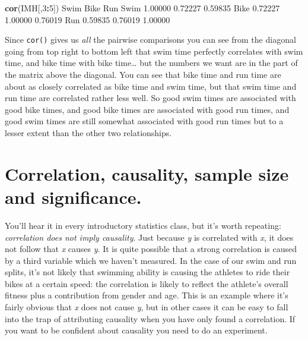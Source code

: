 \documentclass[
]{book}
\newenvironment{Shaded}{\begin{snugshade}}{\end{snugshade}}
\newcommand{\DecValTok}[1]{\textcolor[rgb]{0.00,0.00,0.81}{#1}}
\newcommand{\FloatTok}[1]{\textcolor[rgb]{0.00,0.00,0.81}{#1}}
\newcommand{\KeywordTok}[1]{\textcolor[rgb]{0.13,0.29,0.53}{\textbf{#1}}}
\newcommand{\NormalTok}[1]{#1}
\newcommand{\OperatorTok}[1]{\textcolor[rgb]{0.81,0.36,0.00}{\textbf{#1}}}
\begin{document}
\begin{Shaded}
\begin{Highlighting}[]
\KeywordTok{cor}\NormalTok{(IMH[,}\DecValTok{3}\OperatorTok{:}\DecValTok{5}\NormalTok{])}
\NormalTok{        Swim    Bike     Run}
\NormalTok{Swim }\FloatTok{1.00000} \FloatTok{0.72227} \FloatTok{0.59835}
\NormalTok{Bike }\FloatTok{0.72227} \FloatTok{1.00000} \FloatTok{0.76019}
\NormalTok{Run  }\FloatTok{0.59835} \FloatTok{0.76019} \FloatTok{1.00000}
\end{Highlighting}
\end{Shaded}

Since \texttt{cor()} gives us \emph{all} the pairwise comparisons you can see from the diagonal going from top right to bottom left that swim time perfectly correlates with swim time, and bike time with bike time\ldots{} but the numbers we want are in the part of the matrix above the diagonal. You can see that bike time and run time are about as closely correlated as bike time and swim time, but that swim time and run time are correlated rather less well. So good swim times are associated with good bike times, and good bike times are associated with good run times, and good swim times are still somewhat associated with good run times but to a lesser extent than the other two relationships.

\hypertarget{correlation-causality-sample-size-and-significance.}{%
\section{Correlation, causality, sample size and significance.}\label{correlation-causality-sample-size-and-significance.}}

You'll hear it in every introductory statistics class, but it's worth repeating: \emph{correlation does not imply causality}. Just because \emph{y} is correlated with \emph{x}, it does not follow that \emph{x} causes \emph{y}. It is quite possible that a strong correlation is caused by a third variable which we haven't measured. In the case of our swim and run splits, it's not likely that swimming ability is causing the athletes to ride their bikes at a certain speed: the correlation is likely to reflect the athlete's overall fitness plus a contribution from gender and age. This is an example where it's fairly obvious that \emph{x} does not cause \emph{y}, but in other cases it can be easy to fall into the trap of attributing causality when you have only found a correlation. If you want to be confident about causality you need to do an experiment.
\end{document}
